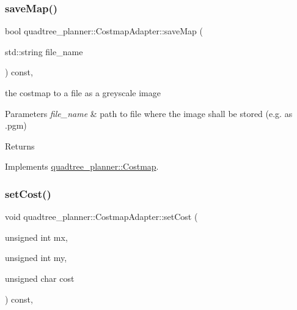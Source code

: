 \mbox{\label{classquadtree__planner_1_1CostmapAdapter_a11201eaf5094483113acf5d195923893}} 
\subsubsection{\texorpdfstring{save\+Map()}{saveMap()}}
{\footnotesize\ttfamily bool quadtree\+\_\+planner\+::\+Costmap\+Adapter\+::save\+Map (\begin{DoxyParamCaption}\item[{std\+::string}]{file\+\_\+name }\end{DoxyParamCaption}) const\hspace{0.3cm}{\ttfamily [override]}, {\ttfamily [virtual]}}



the costmap to a file as a greyscale image 


\begin{DoxyParams}{Parameters}
{\em file\+\_\+name} & path to file where the image shall be stored (e.\+g. as .pgm) \\
\hline
\end{DoxyParams}
\begin{DoxyReturn}{Returns}

\end{DoxyReturn}


Implements \hyperlink{classquadtree__planner_1_1Costmap_ad6251247260f19389a1fa547c9b0d956}{quadtree\+\_\+planner\+::\+Costmap}.

\mbox{\label{classquadtree__planner_1_1CostmapAdapter_a816f4036c5a67297c72302ad4329b98b}} 
\subsubsection{\texorpdfstring{set\+Cost()}{setCost()}}
{\footnotesize\ttfamily void quadtree\+\_\+planner\+::\+Costmap\+Adapter\+::set\+Cost (\begin{DoxyParamCaption}\item[{unsigned int}]{mx,  }\item[{unsigned int}]{my,  }\item[{unsigned char}]{cost }\end{DoxyParamCaption}) const\hspace{0.3cm}{\ttfamily [override]}, {\ttfamily [virtual]}}



